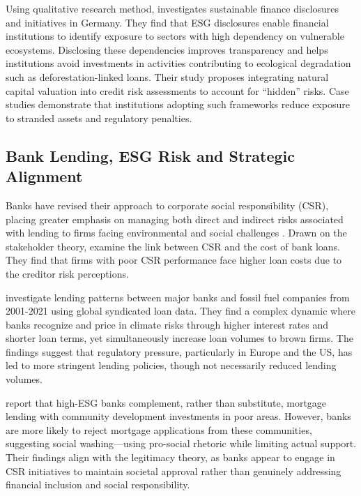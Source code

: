 \documentclass[
  authoryear]{elsarticle}
\begin{document}
Using qualitative research method, \citet{KUHN2022} investigates
sustainable finance disclosures and initiatives in Germany. They find
that ESG disclosures enable financial institutions to identify exposure
to sectors with high dependency on vulnerable ecosystems. Disclosing
these dependencies improves transparency and helps institutions avoid
investments in activities contributing to ecological degradation such as
deforestation-linked loans. Their study proposes integrating natural
capital valuation into credit risk assessments to account for ``hidden''
risks. Case studies demonstrate that institutions adopting such
frameworks reduce exposure to stranded assets and regulatory penalties.

\subsection{Bank Lending, ESG Risk and Strategic
Alignment}\label{bank-lending-esg-risk-and-strategic-alignment}

Banks have revised their approach to corporate social responsibility
(CSR), placing greater emphasis on managing both direct and indirect
risks associated with lending to firms facing environmental and social
challenges \citep{CARNEVALE2012}. Drawn on the stakeholder theory,
\citet{GOSS2011} examine the link between CSR and the cost of bank
loans. They find that firms with poor CSR performance face higher loan
costs due to the creditor risk perceptions.

\citet{DEMETRIADES2025} investigate lending patterns between major banks
and fossil fuel companies from 2001-2021 using global syndicated loan
data. They find a complex dynamic where banks recognize and price in
climate risks through higher interest rates and shorter loan terms, yet
simultaneously increase loan volumes to brown firms. The findings
suggest that regulatory pressure, particularly in Europe and the US, has
led to more stringent lending policies, though not necessarily reduced
lending volumes.

\citet{BASU2022} report that high-ESG banks complement, rather than
substitute, mortgage lending with community development investments in
poor areas. However, banks are more likely to reject mortgage
applications from these communities, suggesting social washing---using
pro-social rhetoric while limiting actual support. Their findings align
with the legitimacy theory, as banks appear to engage in CSR initiatives
to maintain societal approval rather than genuinely addressing financial
inclusion and social responsibility.
\end{document}
